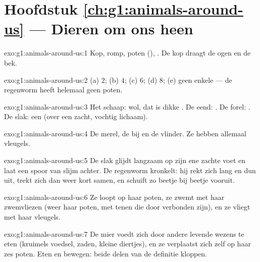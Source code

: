 \section*{Hoofdstuk \ref{ch:g1:animals-around-us} --- Dieren om ons heen}

\begin{solution}{exo:g1:animals-around-us:1}
Kop, romp, poten (), . De kop draagt de ogen en de bek.
\end{solution}

\begin{solution}{exo:g1:animals-around-us:2}
(a) $2$; (b) $4$; (c) $6$; (d) $8$; (e) geen enkele --- de regenworm
heeft helemaal geen poten.
\end{solution}

\begin{solution}{exo:g1:animals-around-us:3}
Het schaap: wol, dat is dikke . De eend: . De forel:
. De slak: een  (over een zacht, vochtig lichaam).
\end{solution}

\begin{solution}{exo:g1:animals-around-us:4}
De merel, de bij en de vlinder. Ze hebben allemaal vleugels.
\end{solution}

\begin{solution}{exo:g1:animals-around-us:5}
De slak glijdt langzaam op zijn ene zachte voet en laat een spoor van
slijm achter. De regenworm kronkelt: hij rekt zich lang en dun uit,
trekt zich dan weer kort samen, en schuift zo beetje bij beetje vooruit.
\end{solution}

\begin{solution}{exo:g1:animals-around-us:6}
Ze loopt op haar poten, ze zwemt met haar zwemvliezen (weer haar poten,
met tenen die door  verbonden zijn), en ze vliegt met haar vleugels.
\end{solution}

\begin{solution}{exo:g1:animals-around-us:7}
De mier voedt zich door andere levende wezens te eten (kruimels
voedsel, zaden, kleine diertjes), en ze verplaatst zich zelf op haar
zes poten. Eten en bewegen: beide delen van de definitie kloppen.
\end{solution}

